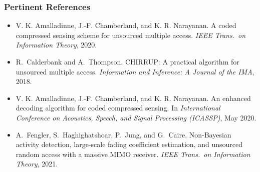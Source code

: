 
\begin{frame}
\frametitle{Pertinent References}
\begin{scriptsize}
\begin{itemize}
\item
V. K. Amalladinne, J.-F. Chamberland, and K. R. Narayanan.
A coded compressed sensing scheme for unsourced multiple access.
\emph{IEEE Trans.\ on Information Theory}, 2020.

\item
R.~Calderbank and A.~Thompson.
CHIRRUP: A practical algorithm for unsourced multiple access.
\emph{Information and Inference: A Journal of the IMA}, 2018.

\item
V. K. Amalladinne, J.-F. Chamberland, and K. R. Narayanan.
An enhanced decoding algorithm for coded compressed sensing.
In \emph{International Conference on Acoustics, Speech, and Signal Processing (ICASSP)}, May 2020.

\item
A.~Fengler, S.~Haghighatshoar, P.~Jung, and G.~Caire.
Non-Bayesian activity detection, large-scale fading coefficient estimation, and unsourced random access with a massive MIMO receiver.
\emph{IEEE Trans.\ on Information Theory}, 2021.
\end{itemize}
\end{scriptsize}
\end{frame}

